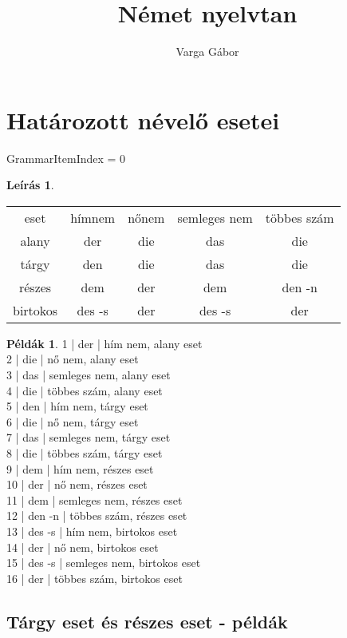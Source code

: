 \documentclass{article}
\title{Német nyelvtan}
\author{Varga Gábor}
\theoremstyle{definition}
\newtheorem*{exmp}{Példák}
\newtheorem*{desc}{Leírás}
\begin{document}
\maketitle

\tableofcontents

\section{Határozott névelő esetei}

GrammarItemIndex = 0

\begin{desc}
\begin{tabular}{ccccc}
eset & hímnem & nőnem & semleges nem & többes szám\\
alany & der & die & das & die\\
tárgy & den & die & das & die\\
részes & dem & der & dem & den -n\\
birtokos & des -s & der & des -s & der\\
\end{tabular}
\end{desc}

\begin{exmp}
1 | der | hím nem, alany eset\\
2 | die | nő nem, alany eset\\
3 | das | semleges nem, alany eset\\
4 | die | többes szám, alany eset\\
5 | den | hím nem, tárgy eset\\
6 | die | nő nem, tárgy eset\\
7 | das | semleges nem, tárgy eset\\
8 | die | többes szám, tárgy eset\\
9 | dem | hím nem, részes eset\\
10 | der | nő nem, részes eset\\
11 | dem | semleges nem, részes eset\\
12 | den -n | többes szám, részes eset\\
13 | des -s | hím nem, birtokos eset\\
14 | der | nő nem, birtokos eset\\
15 | des -s | semleges nem, birtokos eset\\
16 | der | többes szám, birtokos eset\\
\end{exmp}

\subsection{Tárgy eset és részes eset - példák}
\end{document}
